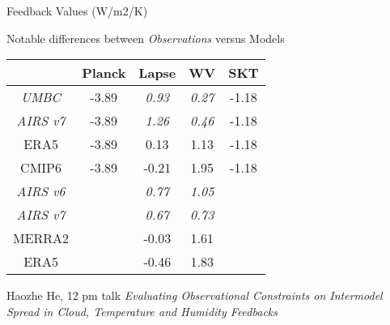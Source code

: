 \documentclass[10pt,t]{beamer}
\begin{document}
\begin{frame}{Feedback Values (W/m2/K)}

Notable differences between \emph{Observations} versus Models

\begin{center}
\begin{tabular}{ c c c c c}
\hline
        &   Planck   &     Lapse    &      WV    &        SKT  \\
\hline
\emph{UMBC}    & -3.89  &   \emph{0.93}   &   \emph{0.27} &   -1.18 \\
\emph{AIRS v7} & -3.89  &   \emph{1.26}   &   \emph{0.46} &   -1.18 \\
ERA5    & -3.89  &   0.13   &   1.13 &   -1.18 \\
CMIP6   & -3.89  &  -0.21   &   1.95 &   -1.18 \\
\hline
\hline
\emph{AIRS v6} & & \emph{0.77} & \emph{1.05} & \\
\emph{AIRS v7} & & \emph{0.67} & \emph{0.73} & \\
MERRA2  & & -0.03 & 1.61 & \\
ERA5    & & -0.46 & 1.83 & \\
\hline
\end{tabular}
\end{center}
Haozhe He, 12 pm talk \emph{Evaluating Observational Constraints on Intermodel Spread in
Cloud, Temperature and Humidity Feedbacks}

\end{frame}

\end{document}
